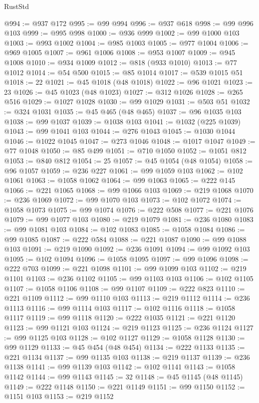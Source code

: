 \begin{lexlean}{RustStd}
\begin{coremodule}
@994 := @937 @172
@995 := @99 @994
@996 := @937 @618
@998 := @99 @996 @103
@999 := @995 @998
@1000 := @936 @999
@1002 := @99 @1000 @103
@1003 := @993 @1002
@1004 := @985 @1003
@1005 := @977 @1004
@1006 := @969 @1005
@1007 := @961 @1006
@1008 := @953 @1007
@1009 := @945 @1008
@1010 := @934 @1009
@1012 := @818 (@933 @1010)
@1013 := @77 @1012
@1014 := @54 @500
@1015 := @85 @1014
@1017 := @539 @1015 @51
@1018 := 22
@1021 := @45 @1018 (@48 @1018)
@1022 := @96 @1021
@1023 := 23
@1026 := @45 @1023 (@48 @1023)
@1027 := @312 @1026
@1028 := @265 @516
@1029 := @1027 @1028
@1030 := @99 @1029
@1031 := @503 @51
@1032 := @324 @1031
@1035 := @45 @465 (@48 @465)
@1037 := @96 @1035 @103
@1038 := @99 @1037
@1039 := @1038 @103
@1041 := @1032 (@225 @1039)
@1043 := @99 @1041 @103
@1044 := @276 @1043
@1045 := @1030 @1044
@1046 := @1022 @1045
@1047 := @273 @1046
@1048 := @1017 @1047
@1049 := @77 @1048
@1050 := @85 @499
@1051 := @710 @1050
@1052 := @1051 @812
@1053 := @840 @812
@1054 := 25
@1057 := @45 @1054 (@48 @1054)
@1058 := @96 @1057
@1059 := @236 @227
@1061 := @99 @1059 @103
@1062 := @102 @1061
@1063 := @1058 @1062
@1064 := @99 @1063
@1065 := @222 @145
@1066 := @221 @1065
@1068 := @99 @1066 @103
@1069 := @219 @1068
@1070 := @236 @1069
@1072 := @99 @1070 @103
@1073 := @102 @1072
@1074 := @1058 @1073
@1075 := @99 @1074
@1076 := @222 @508
@1077 := @221 @1076
@1079 := @99 @1077 @103
@1080 := @219 @1079
@1081 := @236 @1080
@1083 := @99 @1081 @103
@1084 := @102 @1083
@1085 := @1058 @1084
@1086 := @99 @1085
@1087 := @222 @584
@1088 := @221 @1087
@1090 := @99 @1088 @103
@1091 := @219 @1090
@1092 := @236 @1091
@1094 := @99 @1092 @103
@1095 := @102 @1094
@1096 := @1058 @1095
@1097 := @99 @1096
@1098 := @222 @703
@1099 := @221 @1098
@1101 := @99 @1099 @103
@1102 := @219 @1101
@1103 := @236 @1102
@1105 := @99 @1103 @103
@1106 := @102 @1105
@1107 := @1058 @1106
@1108 := @99 @1107
@1109 := @222 @823
@1110 := @221 @1109
@1112 := @99 @1110 @103
@1113 := @219 @1112
@1114 := @236 @1113
@1116 := @99 @1114 @103
@1117 := @102 @1116
@1118 := @1058 @1117
@1119 := @99 @1118
@1120 := @222 @1035
@1121 := @221 @1120
@1123 := @99 @1121 @103
@1124 := @219 @1123
@1125 := @236 @1124
@1127 := @99 @1125 @103
@1128 := @102 @1127
@1129 := @1058 @1128
@1130 := @99 @1129
@1133 := @45 @454 (@48 @454)
@1134 := @222 @1133
@1135 := @221 @1134
@1137 := @99 @1135 @103
@1138 := @219 @1137
@1139 := @236 @1138
@1141 := @99 @1139 @103
@1142 := @102 @1141
@1143 := @1058 @1142
@1144 := @99 @1143
@1145 := 32
@1148 := @45 @1145 (@48 @1145)
@1149 := @222 @1148
@1150 := @221 @1149
@1151 := @99 @1150
@1152 := @1151 @103
@1153 := @219 @1152

\end{coremodule}
\end{lexlean}
